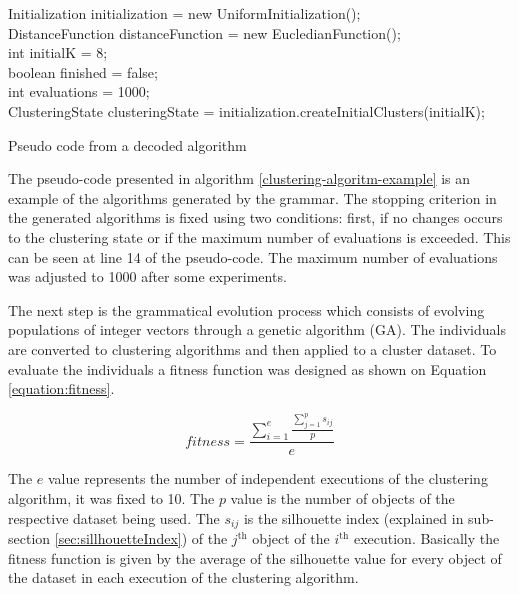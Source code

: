 \documentclass[journal]{IEEEtran}
\begin{document}
	\begin{algorithm}[!htb]
		\label{clustering-algoritm-example}
		Initialization initialization = new UniformInitialization(); \\
		DistanceFunction distanceFunction = new EucledianFunction(); \\
		int initialK = 8; \\
		boolean finished = false; \\
		int evaluations = 1000;\\
		ClusteringState 
		clusteringState = initialization.createInitialClusters(initialK); \\
		\caption{Pseudo code from a decoded algorithm}
	\end{algorithm}
	
	The pseudo-code presented in algorithm \ref{clustering-algoritm-example} is an example of the algorithms generated by the grammar. The stopping criterion in the generated algorithms is fixed using two conditions: first, if no changes occurs to the clustering state or if the maximum number of evaluations is exceeded. This can be seen at line 14 of the pseudo-code. The maximum number of evaluations was adjusted to 1000 after some experiments.
	
	The next step is the grammatical evolution process which consists of evolving populations of integer vectors through a genetic algorithm (GA). The individuals are converted to clustering algorithms and then applied to a cluster dataset. To evaluate the individuals a fitness function was designed as shown on Equation \ref{equation:fitness}.
	
	\begin{equation} \label{equation:fitness}
		fitness = \frac{\sum_{i=1}^e \frac{\sum_{j=1}^{p} s_{ij}}{p}}{e}
	\end{equation}
	
	The $e$ value represents the number of independent executions of the clustering algorithm, it was fixed to 10. The $p$ value is the number of objects of the respective dataset being used. The $s_{ij}$ is the silhouette index (explained in sub-section \ref{sec:sillhouetteIndex}) of the $j^{\text{th}}$ object of the $i^{\text{th}}$ execution. Basically the fitness function is given by the average of the silhouette value for every object of the dataset in each execution of the clustering algorithm.
	
\end{document}
